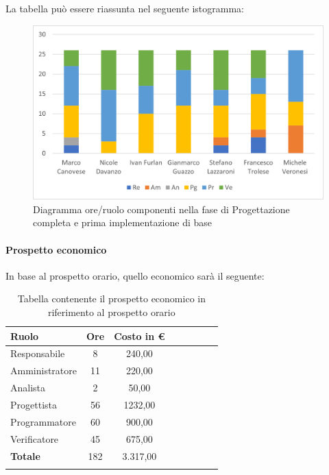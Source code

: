 La tabella può essere riassunta nel seguente istogramma:

\begin{figure}[H]
	\centering
	\includegraphics[width=0.8\linewidth]{res/images/preventivo/5-1.png}
	\caption{Diagramma ore/ruolo componenti nella fase di Progettazione completa e prima implementazione di base}
	\label{fig:diagramma suddivisione ruoli fase progettazione completa e prima implementazione di base}
\end{figure}

\paragraph{Prospetto economico}
In base al prospetto orario, quello economico sarà il seguente:

\begin{longtable}{|l|c|c|c|c|c|c|c|}
	\hline
	\rowcolor{lighter-grayer}
	\textbf{Ruolo}  & \textbf{Ore} & \textbf{Costo in €} \\
	\hline
	\endfirsthead

	\hline
	Responsabile    & 8            & 240,00              \\
	\hline
	\hline
	Amministratore  & 11           & 220,00              \\
	\hline
	\hline
	Analista        & 2            & 50,00               \\
	\hline
	\hline
	Progettista     & 56           & 1232,00             \\
	\hline
	\hline
	Programmatore   & 60           & 900,00              \\
	\hline
	\hline
	Verificatore    & 45           & 675,00              \\
	\hline
	\hline
	\textbf{Totale} & 182          & 3.317,00            \\
	\hline
	\rowcolor{white}
	\caption{Tabella contenente il prospetto economico in riferimento al prospetto orario}
\end{longtable}
\pagebreak

